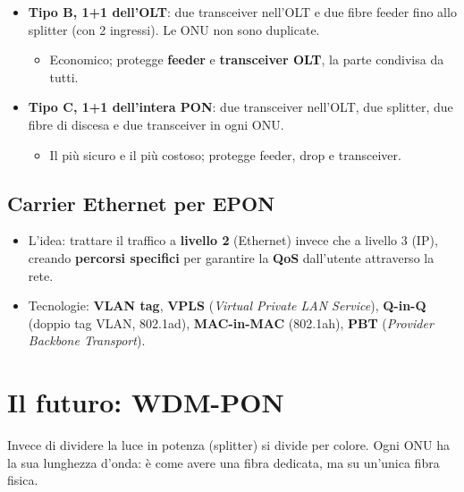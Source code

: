 \begin{itemize}
\tightlist
\item
  \textbf{Tipo B, 1+1 dell'OLT}: due transceiver nell'OLT e due fibre feeder fino allo splitter (con 2 ingressi). Le ONU non sono duplicate.

  \begin{itemize}
  \tightlist
  \item
    Economico; protegge \textbf{feeder} e \textbf{transceiver OLT}, la parte condivisa da tutti.
  \end{itemize}
\item
  \textbf{Tipo C, 1+1 dell'intera PON}: due transceiver nell'OLT, due splitter, due fibre di discesa e due transceiver in ogni ONU.

  \begin{itemize}
  \tightlist
  \item
    Il più sicuro e il più costoso; protegge feeder, drop e transceiver.
  \end{itemize}
\end{itemize}

\subsection{Carrier Ethernet per EPON}

\begin{itemize}
\tightlist
\item
  L'idea: trattare il traffico a \textbf{livello 2} (Ethernet) invece che a livello 3 (IP), creando \textbf{percorsi specifici} per garantire la \textbf{QoS} dall'utente attraverso la rete.
\item
  Tecnologie: \textbf{VLAN tag}, \textbf{VPLS} (\emph{Virtual Private LAN Service}), \textbf{Q-in-Q} (doppio tag VLAN, 802.1ad), \textbf{MAC-in-MAC} (802.1ah), \textbf{PBT} (\emph{Provider Backbone Transport}).
\end{itemize}

\section{Il futuro: WDM-PON}

\begin{inbreve}

Invece di dividere la luce in potenza (splitter) si divide per colore. Ogni ONU ha la sua lunghezza d'onda: è come avere una fibra dedicata, ma su un'unica fibra fisica.

\end{inbreve}

